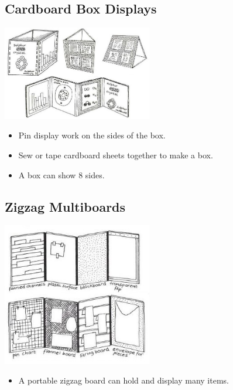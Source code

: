 \begin{multicols}{2}

\section{Cardboard Box Displays}

\begin{center}
\includegraphics[width=0.49\textwidth]{./img/vso/cardboard-box.jpg}
\end{center}

\begin{itemize}
\item Pin display work on the sides of
the box.
\item Sew or tape cardboard sheets
together to make a box.
\item A box can show 8 sides.
\end{itemize}


\subsection{Zigzag Multiboards}

\begin{center}
\includegraphics[width=0.49\textwidth]{./img/vso/zigzag.jpg}
\end{center}

\begin{itemize}
\item A portable zigzag board can hold and display many items.
\end{itemize}



\end{multicols}
